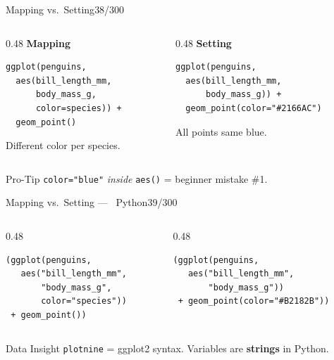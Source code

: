 \documentclass[10pt]{beamer}
\newcommand{\Python}{\textcolor{PyAccent}{\faPython~Python}}
\newcommand{\smark}[1]{\hfill{\scriptsize\color{codegray}#1}}
\begin{document}
\begin{frame}[fragile]{Mapping vs.\ Setting}\smark{38/300}
\begin{columns}[T]
\begin{column}{0.48\textwidth}
\centering\textbf{Mapping}\\[0.1cm]
\begin{lstlisting}[style=Rstyle]
ggplot(penguins,
  aes(bill_length_mm,
      body_mass_g,
      color=species)) +
  geom_point()
\end{lstlisting}
\scriptsize Different color per species.
\end{column}
\begin{column}{0.48\textwidth}
\centering\textbf{Setting}\\[0.1cm]
\begin{lstlisting}[style=Rstyle]
ggplot(penguins,
  aes(bill_length_mm,
      body_mass_g)) +
  geom_point(color="#2166AC")
\end{lstlisting}
\scriptsize All points same blue.
\end{column}
\end{columns}
\vspace{0.2cm}
\begin{alertblock}{Pro-Tip}
    \scriptsize \texttt{color="blue"} \emph{inside} \texttt{aes()} = beginner mistake \#1.
\end{alertblock}
\end{frame}

\begin{frame}[fragile]{Mapping vs.\ Setting --- \Python}\smark{39/300}
\begin{columns}[T]
\begin{column}{0.48\textwidth}
\begin{lstlisting}[style=Pystyle]
(ggplot(penguins,
   aes("bill_length_mm",
       "body_mass_g",
       color="species"))
 + geom_point())
\end{lstlisting}
\end{column}
\begin{column}{0.48\textwidth}
\begin{lstlisting}[style=Pystyle]
(ggplot(penguins,
   aes("bill_length_mm",
       "body_mass_g"))
 + geom_point(color="#B2182B"))
\end{lstlisting}
\end{column}
\end{columns}
\vspace{0.2cm}
\begin{exampleblock}{Data Insight}
    \scriptsize \texttt{plotnine} = ggplot2 syntax. Variables are \textbf{strings} in Python.
\end{exampleblock}
\end{frame}
\end{document}
